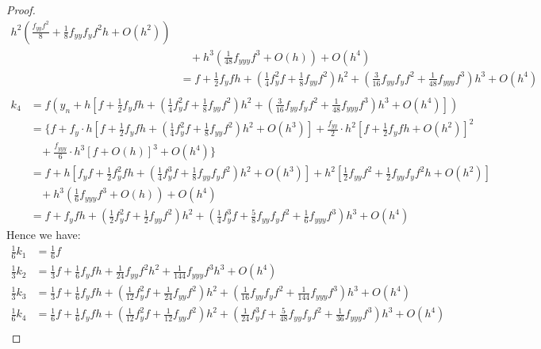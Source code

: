 \documentclass[a4paper, 10pt]{article}
\theoremstyle{definition}
\theoremstyle{hSol}
\begin{document}
\begin{proof}
\begin{equation}
\begin{split}
    h^2 \left(\tfrac{f_{yy}f^2}{8} + \tfrac{1}{8}f_{yy}f_yf^2 h + O(h^2)\right) \\
    &~~~~+h^3 \left(\tfrac{1}{48}f_{yyy}f^3 + O(h)\right) + O(h^4)\\
    &= f + \tfrac{1}{2}f_yfh + (\tfrac{1}{4}f_y^2f+\tfrac{1}{8}f_{yy}f^2)h^2 + (\tfrac{3}{16}f_{yy}f_yf^2+\tfrac{1}{48}f_{yyy}f^3)h^3 + O(h^4)\\
    \end{split}
\end{equation}
\begin{equation}
  \begin{split}
    k_4 &= f\left(y_n + h\left[f + \tfrac{1}{2}f_yfh + (\tfrac{1}{4}f_y^2f+\tfrac{1}{8}f_{yy}f^2)h^2 + (\tfrac{3}{16}f_{yy}f_yf^2+\tfrac{1}{48}f_{yyy}f^3)h^3 + O(h^4)\right]\right) \\
    & = \Big\{ f + f_y\cdot h\left[f + \tfrac{1}{2}f_yfh + (\tfrac{1}{4}f_y^2f+\tfrac{1}{8}f_{yy}f^2)h^2+O(h^3)\right] + \tfrac{f_{yy}}{2}\cdot h^2\left[f + \tfrac{1}{2}f_yfh + O(h^2)\right]^2\\
    &~~~~+\tfrac{f_{yyy}}{6}\cdot h^3\left[f + O(h)\right]^3 + O(h^4)\Big\}\\
    & = f + 
    h \left[f_yf + \tfrac{1}{2}f_y^2f h + (\tfrac{1}{4}f_y^3f+\tfrac{1}{8}f_{yy}f_yf^2)h^2 + O(h^3)\right]+ h^2\left[\tfrac{1}{2}f_{yy}f^2 + \tfrac{1}{2}f_{yy}f_yf^2h + O(h^2)\right] \\
    &~~~~+h^3(\tfrac{1}{6}f_{yyy}f^3 + O(h)) + O(h^4)\\
    &= f + f_y fh + (\tfrac{1}{2}f_y^2f+\tfrac{1}{2}f_{yy}f^2)h^2 + (\tfrac{1}{4}f_y^3f + \tfrac{5}{8}f_{yy}f_yf^2+\tfrac{1}{6}f_{yyy}f^3)h^3 + O(h^4)
  \end{split}
\end{equation}
Hence we have:
\begin{equation}
  \begin{split}
    \tfrac{1}{6}k_1 &= \tfrac{1}{6} f \\
    \tfrac{1}{3}k_2 &= \tfrac{1}{3}f + \tfrac{1}{6}f_yf h + \tfrac{1}{24}f_{yy}f^2 h^2 + \tfrac{1}{144}f_{yyy}f^3 h^3 + O(h^4) \\
    \tfrac{1}{3}k_3 &= \tfrac{1}{3}f + \tfrac{1}{6}f_yfh + (\tfrac{1}{12}f_y^2f+\tfrac{1}{24}f_{yy}f^2)h^2 + (\tfrac{1}{16}f_{yy}f_yf^2+\tfrac{1}{144}f_{yyy}f^3)h^3 + O(h^4)\\
    \tfrac{1}{6}k_4 &= \tfrac{1}{6}f + \tfrac{1}{6}f_y fh + (\tfrac{1}{12}f_y^2f+\tfrac{1}{12}f_{yy}f^2)h^2 + (\tfrac{1}{24}f_y^3f + \tfrac{5}{48}f_{yy}f_yf^2+\tfrac{1}{36}f_{yyy}f^3)h^3 + O(h^4)\\

\end{split}
\end{equation}
\end{proof}
\end{document}

